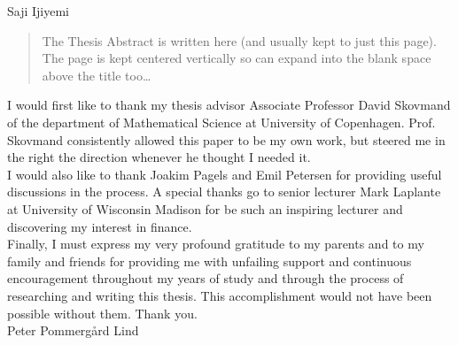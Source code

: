 \documentclass[
11pt, %
english, %
singlespacing, %
headsepline, %
]{MastersDoctoralThesis} %
\theoremstyle{assumption}
\theoremstyle{definition}
\theoremstyle{proposition}
\begin{document}
\hfill Saji Ijiyemi


\begin{abstract}
\addchaptertocentry{\abstractname} %
The Thesis Abstract is written here (and usually kept to just this page). The page is kept centered vertically so can expand into the blank space above the title too\ldots
\end{abstract}


\begin{acknowledgements}
\addchaptertocentry{\acknowledgementname} %
I would first like to thank my thesis advisor Associate Professor David Skovmand of the department of Mathematical Science at University of Copenhagen. Prof. Skovmand consistently allowed this paper to be my own work, but steered me in the right the direction whenever he thought I needed it.\\

I would also like to thank Joakim Pagels and Emil Petersen for providing useful discussions in the process. A special thanks go to senior lecturer Mark Laplante at University of Wisconsin Madison for be such an inspiring lecturer and discovering my interest in finance.\\

Finally, I must express my very profound gratitude to my parents and to my family and friends for providing me with unfailing support and continuous encouragement throughout my years of study and through the process of researching and writing this thesis. This accomplishment would not have been possible without them. Thank you.\\

Peter Pommergård Lind
\end{acknowledgements}

\end{document}

